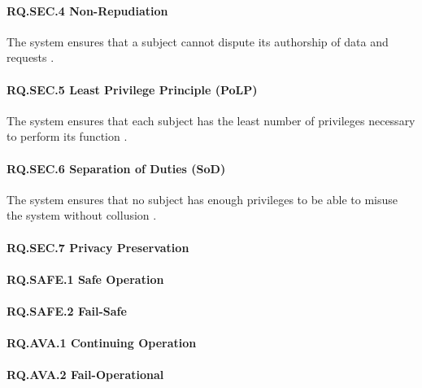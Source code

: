\paragraph{RQ.SEC.4 Non-Repudiation}
The system ensures that a subject cannot dispute its authorship of data and requests \cite{Eckert2023}.
\paragraph{RQ.SEC.5 Least Privilege Principle (PoLP)}
The system ensures that each subject has the least number of privileges necessary to perform its function \cite{JTF2020}.
\paragraph{RQ.SEC.6 Separation of Duties (SoD)}
The system ensures that no subject has enough privileges to be able to misuse the system without collusion \cite{JTF2020}.
\paragraph{RQ.SEC.7 Privacy Preservation}

\paragraph{RQ.SAFE.1 Safe Operation}
\paragraph{RQ.SAFE.2 Fail-Safe}

\paragraph{RQ.AVA.1 Continuing Operation}
\paragraph{RQ.AVA.2 Fail-Operational}

